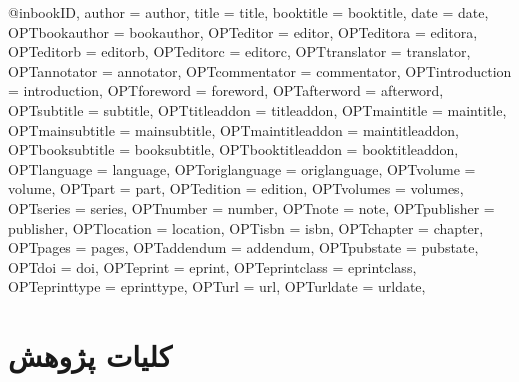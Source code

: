 @inbook{ID,
	author = {author},
	title = {title},
	booktitle = {booktitle},
	date = {date},
	OPTbookauthor = {bookauthor},
	OPTeditor = {editor},
	OPTeditora = {editora},
	OPTeditorb = {editorb},
	OPTeditorc = {editorc},
	OPTtranslator = {translator},
	OPTannotator = {annotator},
	OPTcommentator = {commentator},
	OPTintroduction = {introduction},
	OPTforeword = {foreword},
	OPTafterword = {afterword},
	OPTsubtitle = {subtitle},
	OPTtitleaddon = {titleaddon},
	OPTmaintitle = {maintitle},
	OPTmainsubtitle = {mainsubtitle},
	OPTmaintitleaddon = {maintitleaddon},
	OPTbooksubtitle = {booksubtitle},
	OPTbooktitleaddon = {booktitleaddon},
	OPTlanguage = {language},
	OPToriglanguage = {origlanguage},
	OPTvolume = {volume},
	OPTpart = {part},
	OPTedition = {edition},
	OPTvolumes = {volumes},
	OPTseries = {series},
	OPTnumber = {number},
	OPTnote = {note},
	OPTpublisher = {publisher},
	OPTlocation = {location},
	OPTisbn = {isbn},
	OPTchapter = {chapter},
	OPTpages = {pages},
	OPTaddendum = {addendum},
	OPTpubstate = {pubstate},
	OPTdoi = {doi},
	OPTeprint = {eprint},
	OPTeprintclass = {eprintclass},
	OPTeprinttype = {eprinttype},
	OPTurl = {url},
	OPTurldate = {urldate},
}
\clearpage
\thispagestyle{empty}

\renewcommand{\@makefntext}[1]{%
  \parindent 1em%
  \noindent
  \@makefnmark#1}

\chapter{کلیات پژوهش}\label{chap1}


